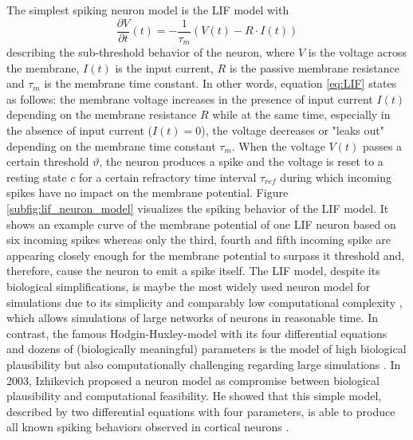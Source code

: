 The simplest spiking neuron model is the \acf{LIF} model with
\begin{equation}
\frac{\partial V}{\partial t}(t) = - \frac{1}{\tau_{m}} \left( V\left(t\right) - R \cdot I\left(t\right) \right)
\label{eq:LIF}
\end{equation}
describing the sub-threshold behavior of the neuron, where $V$ is the voltage across the membrane, $I(t)$ is the input current, $R$ is the passive membrane resistance and $\tau_{m}$ is the membrane time constant.
In other words, equation \ref{eq:LIF} states as follows: the membrane voltage increases in the presence of input current $I(t)$ depending on the membrane resistance $R$ while at the same time, especially in the absence of input current ($I(t)=0$), the voltage decreases or "leaks out" depending on the membrane time constant $\tau_{m}$.
When the voltage $V(t)$ passes a certain threshold $\vartheta$, the neuron produces a spike and the voltage is reset to a resting state $c$ for a certain refractory time interval $\tau_{ref}$ during which incoming spikes have no impact on the membrane potential.
Figure \ref{subfig:lif_neuron_model} visualizes the spiking behavior of the \ac{LIF} model.
It shows an example curve of the membrane potential of one \ac{LIF} neuron based on six incoming spikes whereas only the third, fourth and fifth incoming spike are appearing closely enough for the membrane potential to surpass it threshold and, therefore, cause the neuron to emit a spike itself.
The \ac{LIF} model, despite its biological simplifications, is maybe the most widely used neuron model for simulations due to its simplicity and comparably low computational complexity \cite{Izhikevich2004}, which allows simulations of large networks of neurons in reasonable time.
In contrast, the famous Hodgin-Huxley-model \cite{Hodgkin1952} with its four differential equations and dozens of (biologically meaningful) parameters is the model of high biological plausibility but also computationally challenging regarding large simulations \cite{Izhikevich2004}.
In 2003, Izhikevich proposed a neuron model \cite{Izhikevich2003} as compromise between biological plausibility and computational feasibility.
He showed that this simple model, described by two differential equations with four parameters, is able to produce all known spiking behaviors observed in cortical neurons \cite{Izhikevich2004}. 

